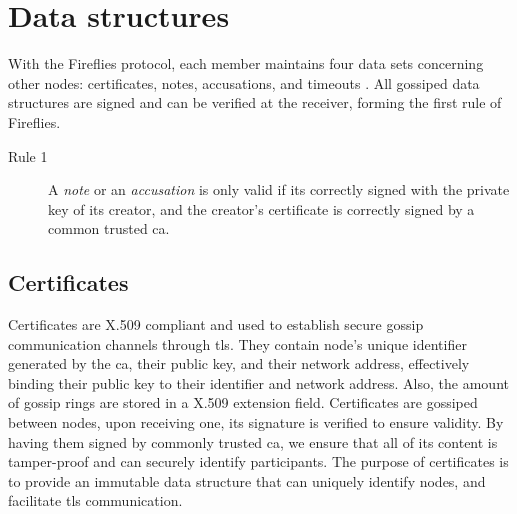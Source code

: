 \documentclass[USenglish]{uit-thesis}
\begin{document}
\section{Data structures}
With the Fireflies protocol, each member maintains four data sets concerning other nodes: certificates, notes, accusations, and timeouts \cite{flies}.
All gossiped data structures are signed and can be verified at the receiver, forming the first rule of Fireflies. 
\begin{description}
\item[Rule 1] A \textit{note} or an \textit{accusation} is only valid if its correctly signed with the private key of its creator, and the creator's certificate is correctly signed by a common trusted \gls{ca}.
\end{description}

\subsection{Certificates}
Certificates are X.509 compliant and used to establish secure gossip communication channels through \gls{tls}.
They contain node's unique identifier generated by the \gls{ca}, their public key, and their network address, effectively binding their public key to their identifier and network address.  
Also, the amount of gossip rings are stored in a X.509 extension field.
Certificates are gossiped between nodes, upon receiving one, its signature is verified to ensure validity.
By having them signed by commonly trusted \gls{ca}, we ensure that all of its content is tamper-proof and can securely identify participants.
The purpose of certificates is to provide an immutable data structure that can uniquely identify nodes, and facilitate \gls{tls} communication.
\end{document}
